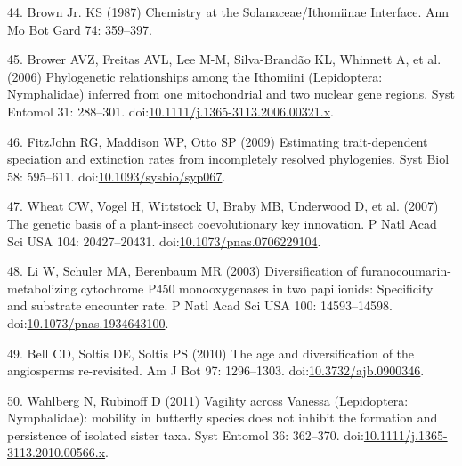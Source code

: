 \documentclass[10pt]{article}
\begin{document}
44. Brown Jr. KS (1987) Chemistry at the Solanaceae/Ithomiinae
Interface. Ann Mo Bot Gard 74: 359--397.

45. Brower AVZ, Freitas AVL, Lee M-M, Silva-Brandão KL, Whinnett A, et
al. (2006) Phylogenetic relationships among the Ithomiini (Lepidoptera:
Nymphalidae) inferred from one mitochondrial and two nuclear gene
regions. Syst Entomol 31: 288--301.
doi:\href{http://dx.doi.org/10.1111/j.1365-3113.2006.00321.x}{10.1111/j.1365-3113.2006.00321.x}.

46. {FitzJohn} RG, Maddison WP, Otto SP (2009) Estimating
trait-dependent speciation and extinction rates from incompletely
resolved phylogenies. Syst Biol 58: 595--611.
doi:\href{http://dx.doi.org/10.1093/sysbio/syp067}{10.1093/sysbio/syp067}.

47. Wheat CW, Vogel H, Wittstock U, Braby MB, Underwood D, et al. (2007)
The genetic basis of a plant-insect coevolutionary key innovation. P
Natl Acad Sci USA 104: 20427--20431.
doi:\href{http://dx.doi.org/10.1073/pnas.0706229104}{10.1073/pnas.0706229104}.

48. Li W, Schuler MA, Berenbaum MR (2003) Diversification of
furanocoumarin-metabolizing cytochrome P450 monooxygenases in two
papilionids: Specificity and substrate encounter rate. P Natl Acad Sci
USA 100: 14593--14598.
doi:\href{http://dx.doi.org/10.1073/pnas.1934643100}{10.1073/pnas.1934643100}.

49. Bell CD, Soltis DE, Soltis PS (2010) The age and diversification of
the angiosperms re-revisited. Am J Bot 97: 1296--1303.
doi:\href{http://dx.doi.org/10.3732/ajb.0900346}{10.3732/ajb.0900346}.

50. Wahlberg N, Rubinoff D (2011) Vagility across Vanessa (Lepidoptera:
Nymphalidae): mobility in butterfly species does not inhibit the
formation and persistence of isolated sister taxa. Syst Entomol 36:
362--370.
doi:\href{http://dx.doi.org/10.1111/j.1365-3113.2010.00566.x}{10.1111/j.1365-3113.2010.00566.x}.


\end{document}
